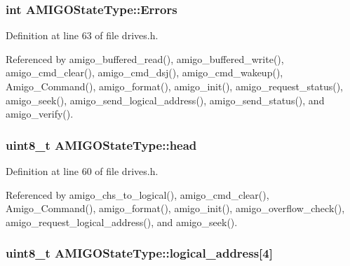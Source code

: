 \subsubsection[{\texorpdfstring{Errors}{Errors}}]{\setlength{\rightskip}{0pt plus 5cm}int A\+M\+I\+G\+O\+State\+Type\+::\+Errors}\hypertarget{structAMIGOStateType_ad04b5b3ffd8fabff547e6498d534feac}{}\label{structAMIGOStateType_ad04b5b3ffd8fabff547e6498d534feac}


Definition at line 63 of file drives.\+h.



Referenced by amigo\+\_\+buffered\+\_\+read(), amigo\+\_\+buffered\+\_\+write(), amigo\+\_\+cmd\+\_\+clear(), amigo\+\_\+cmd\+\_\+dsj(), amigo\+\_\+cmd\+\_\+wakeup(), Amigo\+\_\+\+Command(), amigo\+\_\+format(), amigo\+\_\+init(), amigo\+\_\+request\+\_\+status(), amigo\+\_\+seek(), amigo\+\_\+send\+\_\+logical\+\_\+address(), amigo\+\_\+send\+\_\+status(), and amigo\+\_\+verify().

\subsubsection[{\texorpdfstring{head}{head}}]{\setlength{\rightskip}{0pt plus 5cm}uint8\+\_\+t A\+M\+I\+G\+O\+State\+Type\+::head}\hypertarget{structAMIGOStateType_a92b01a4e3912d2fcacebcc15a21c66c9}{}\label{structAMIGOStateType_a92b01a4e3912d2fcacebcc15a21c66c9}


Definition at line 60 of file drives.\+h.



Referenced by amigo\+\_\+chs\+\_\+to\+\_\+logical(), amigo\+\_\+cmd\+\_\+clear(), Amigo\+\_\+\+Command(), amigo\+\_\+format(), amigo\+\_\+init(), amigo\+\_\+overflow\+\_\+check(), amigo\+\_\+request\+\_\+logical\+\_\+address(), and amigo\+\_\+seek().

\subsubsection[{\texorpdfstring{logical\+\_\+address}{logical_address}}]{\setlength{\rightskip}{0pt plus 5cm}uint8\+\_\+t A\+M\+I\+G\+O\+State\+Type\+::logical\+\_\+address\mbox{[}4\mbox{]}}\hypertarget{structAMIGOStateType_a924a685ad68765a91714aa6ad4b20d9f}{}\label{structAMIGOStateType_a924a685ad68765a91714aa6ad4b20d9f}


